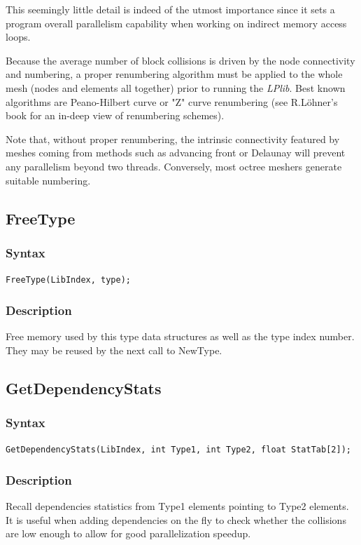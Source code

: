 \documentclass[a4paper,12pt]{article}
\begin{document}
This seemingly little detail is indeed of the utmost importance since it sets a program overall parallelism capability when working on indirect memory access loops.

Because the average number of block collisions is driven by the node connectivity and numbering, a proper renumbering algorithm must be applied to the whole mesh (nodes and elements all together) prior to running the \emph{LPlib}. Best known algorithms are Peano-Hilbert curve or "Z" curve renumbering (see R.Löhner's book \cite {lohner} for an in-deep view of renumbering schemes).

Note that, without proper renumbering, the intrinsic connectivity featured by meshes coming from methods such as advancing front or Delaunay will prevent any parallelism beyond two threads. Conversely, most octree meshers generate suitable numbering.


\subsection{FreeType}

\subsubsection*{Syntax}
\tt{FreeType(LibIndex, type);}
\normalfont

\subsubsection*{Description}
Free memory used by this type data structures as well as the type index number. They may be reused by the next call to NewType.


\subsection{GetDependencyStats}

\subsubsection*{Syntax}
\tt{GetDependencyStats(LibIndex, int Type1, int Type2, float StatTab[2]);}
\normalfont

\subsubsection*{Description}
Recall dependencies statistics from Type1 elements pointing to Type2 elements. It is useful when adding dependencies on the fly to check whether the collisions are low enough to allow for good parallelization speedup.
\end{document}
